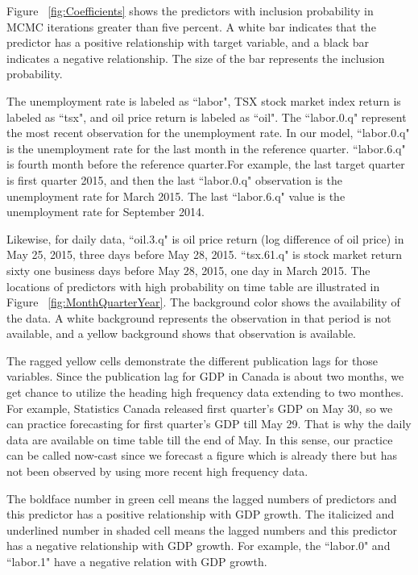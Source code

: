 Figure ~\ref{fig:Coefficients} shows the predictors with inclusion probability in MCMC iterations greater than five percent. A white bar indicates that the predictor has a positive relationship with target variable, and a black bar indicates a negative relationship. The size of the bar represents the inclusion probability. 



The unemployment rate is labeled as ``labor", TSX stock market index return is labeled as ``tsx", and oil price return is labeled as ``oil". The ``labor.0.q" represent the most recent observation for the unemployment rate. In our model, ``labor.0.q" is the unemployment rate for the last month in the reference quarter. ``labor.6.q" is fourth month before the reference quarter.For example, the last target quarter is first quarter 2015, and then the last ``labor.0.q" observation is the  unemployment rate for March 2015. The last ``labor.6.q" value is the unemployment rate for September 2014. 

Likewise, for daily data, ``oil.3.q" is oil price return (log difference of oil price) in May 25, 2015, three days before May 28, 2015. ``tsx.61.q" is stock market return sixty one business days before May 28, 2015, one day in March 2015.  The locations of predictors with high probability on time table  are illustrated in Figure ~\ref{fig:MonthQuarterYear}. The background color shows the availability of the data. A white background represents the observation in that period is not available, and a yellow background shows that observation is available. 


The ragged yellow cells demonstrate the different publication lags for those variables. Since the publication lag for GDP in Canada is about two months, we get chance to utilize the heading high frequency data extending to two monthes. For example, Statistics Canada released first quarter's GDP on May 30, so we can practice forecasting for first quarter's GDP till May 29. That is why the daily data are available on time table till the end of May. In this sense, our practice can be called now-cast since we forecast a figure which is already there but has not been observed by using more recent high frequency data.  


The boldface number in green cell means the lagged numbers of predictors and this predictor has a positive relationship with GDP growth. The italicized and underlined number in shaded cell means the lagged numbers and this predictor has a negative relationship with GDP growth. For example, the ``labor.0" and ``labor.1" have a negative relation with GDP growth.




